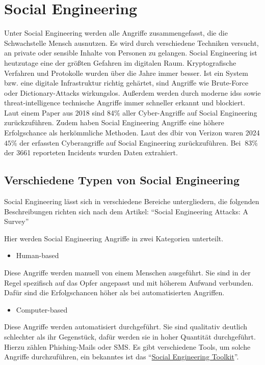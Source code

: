 \section{Social Engineering}\label{sec:social_engineering}
Unter Social Engineering werden alle Angriffe zusammengefasst, die die Schwachstelle Mensch ausnutzen.
Es wird durch verschiedene Techniken versucht, an private oder sensible Inhalte von Personen zu gelangen.
Social Engineering ist heutzutage eine der größten Gefahren im digitalen Raum.
Kryptografische Verfahren und Protokolle wurden über die Jahre immer besser.
Ist ein System bzw. eine digitale Infrastruktur richtig gehärtet, sind Angriffe wie Brute-Force oder Dictionary-Attacks wirkungslos.
Außerdem werden durch moderne \glspl{ids} sowie \gls{threat-intelligence} technische Angriffe immer schneller erkannt und blockiert.
Laut einem Paper aus 2018 sind 84\% aller Cyber-Angriffe auf Social Engineering zurückzuführen.
Zudem haben Social Engineering Angriffe eine höhere Erfolgschance als herkömmliche Methoden.
Laut des \gls{dbir} von Verizon waren 2024 $45\%$ der erfassten Cyberangriffe auf Social Engineering zurückzuführen.
Bei $~83\%$ der 3661 reporteten Incidents wurden Daten extrahiert.\cite{verizon-2024-dbir}


\subsection{Verschiedene Typen von Social Engineering}\label{subsec:verschiedene-typen-von-social-engineering}
Social Engineering lässt sich in verschiedene Bereiche untergliedern, die folgenden Beschreibungen richten sich nach dem Artikel: ``Social Engineering Attacks: A Survey''\cite{social-engineering-a-survey}

Hier werden Social Engineering Angriffe in zwei Kategorien unterteilt.
\begin{itemize}
    \item Human-based
\end{itemize}
    Diese Angriffe werden manuell von einem Menschen ausgeführt.
    Sie sind in der Regel spezifisch auf das Opfer angepasst und mit höherem Aufwand verbunden.
    Dafür sind die Erfolgschancen höher als bei automatisierten Angriffen.
\begin{itemize}
    \item Computer-based
\end{itemize}
Diese Angriffe werden automatisiert durchgeführt.
Sie sind qualitativ deutlich schlechter als ihr Gegenstück, dafür werden sie in hoher Quantität durchgeführt.
Hierzu zählen Phishing-Mails oder SMS.
Es gibt verschiedene Tools, um solche Angriffe durchzuführen, ein bekanntes ist das ``\href{https://github.com/trustedsec/social-engineer-toolkit}{Social Engineering Toolkit}''.

